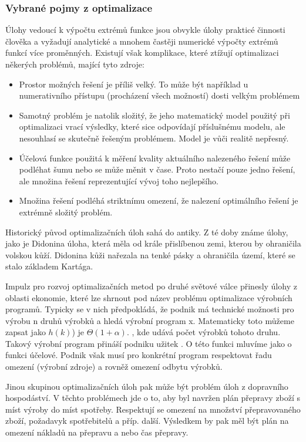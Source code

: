 \documentclass[bc,male,java,dept460]{diploma}		%
\begin{document}
\subsubsection{Vybrané pojmy z optimalizace}
\par Úlohy vedoucí k výpočtu extrémů funkce jsou obvykle úlohy prakticé činnosti člověka a vyžadují analytické a mnohem častěji numerické výpočty extrémů funkcí více proměnných. Existují však komplikace, které ztížují optimalizaci někerých problémů, mající tyto zdroje:
\begin{itemize}
\item Prostor možných řešení je příliš velký. To může být například u numerativního přístupu (procházení všech možností) dosti velkým problémem
\item Samotný problém je natolik složitý, že jeho matematický model použitý při optimalizaci vrací výsledky, které sice odpovídají příslušnému modelu, ale nesouhlasí se skutečně řešeným problémem. Model je vůči realitě nepřesný.
\item Účelová funkce použitá k měření kvality aktuálního nalezeného řešení může podléhat šumu nebo se může měnit v čase. Proto nestačí pouze jedno řešení, ale množina řešení reprezentující vývoj toho nejlepšího.
\item Množina řešení podléhá striktnímu omezení, že nalezení optimálního řešení je extrémně složitý problém.
\end{itemize}
\par Historický původ optimalizačních úloh sahá do antiky. Z té doby známe úlohy, jako je Didonina úloha, která měla od krále přislíbenou zemi, kterou by ohraničila volskou kůží. Didonina kůži nařezala na tenké pásky a ohraničila území, které se stalo základem Kartága.
\par Impulz pro rozvoj optimalizačních metod po druhé světové válce přinesly úlohy z oblasti ekonomie, které lze shrnout pod název problému optimalizace výrobních programů. Typicky se v nich předpokládá, že podnik má technické možnosti pro výrobu n druhů výrobků a hledá výrobní program x. Matematicky toto můžeme zapsat jako $h(k)$) je $\Theta(1+\alpha)$.   , kde  udává počet výrobků tohoto druhu. Takový výrobní program přináší podniku užitek . O této funkci mluvíme jako o funkci účelové. Podnik však musí pro konkrétní program respektovat řadu omezení (výrobní zdroje) a rovněž omezení odbytu výrobků.
\par Jinou skupinou optimalizačních úloh pak může být problém úloh z dopravního hospodáství. V těchto problémech jde o to, aby byl navržen plán přepravy zboží s míst výroby do míst spotřeby. Respektují se omezení na množství přepravovaného zboží, požadavyk spotřebitelů a příp. další. Výsledkem by pak měl být plán na omezení nákladů na přepravu a nebo čas přepravy. 
\end{document}
